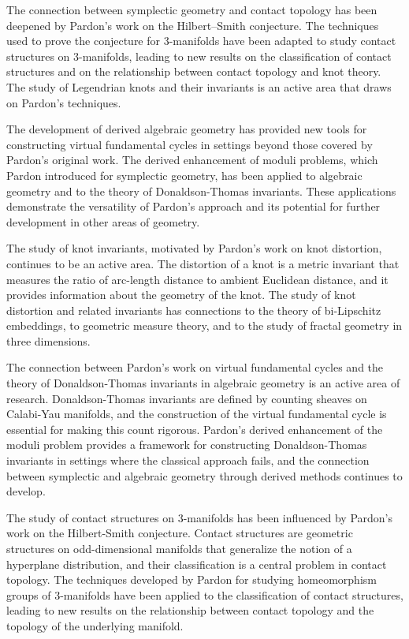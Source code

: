 The connection between symplectic geometry and contact topology has been deepened by Pardon's work on the Hilbert--Smith conjecture. The techniques used to prove the conjecture for 3-manifolds have been adapted to study contact structures on 3-manifolds, leading to new results on the classification of contact structures and on the relationship between contact topology and knot theory. The study of Legendrian knots and their invariants is an active area that draws on Pardon's techniques.

The development of derived algebraic geometry has provided new tools for constructing virtual fundamental cycles in settings beyond those covered by Pardon's original work. The derived enhancement of moduli problems, which Pardon introduced for symplectic geometry, has been applied to algebraic geometry and to the theory of Donaldson-Thomas invariants. These applications demonstrate the versatility of Pardon's approach and its potential for further development in other areas of geometry.

The study of knot invariants, motivated by Pardon's work on knot distortion, continues to be an active area. The distortion of a knot is a metric invariant that measures the ratio of arc-length distance to ambient Euclidean distance, and it provides information about the geometry of the knot. The study of knot distortion and related invariants has connections to the theory of bi-Lipschitz embeddings, to geometric measure theory, and to the study of fractal geometry in three dimensions.

The connection between Pardon's work on virtual fundamental cycles and the theory of Donaldson-Thomas invariants in algebraic geometry is an active area of research. Donaldson-Thomas invariants are defined by counting sheaves on Calabi-Yau manifolds, and the construction of the virtual fundamental cycle is essential for making this count rigorous. Pardon's derived enhancement of the moduli problem provides a framework for constructing Donaldson-Thomas invariants in settings where the classical approach fails, and the connection between symplectic and algebraic geometry through derived methods continues to develop.

The study of contact structures on 3-manifolds has been influenced by Pardon's work on the Hilbert-Smith conjecture. Contact structures are geometric structures on odd-dimensional manifolds that generalize the notion of a hyperplane distribution, and their classification is a central problem in contact topology. The techniques developed by Pardon for studying homeomorphism groups of 3-manifolds have been applied to the classification of contact structures, leading to new results on the relationship between contact topology and the topology of the underlying manifold.

